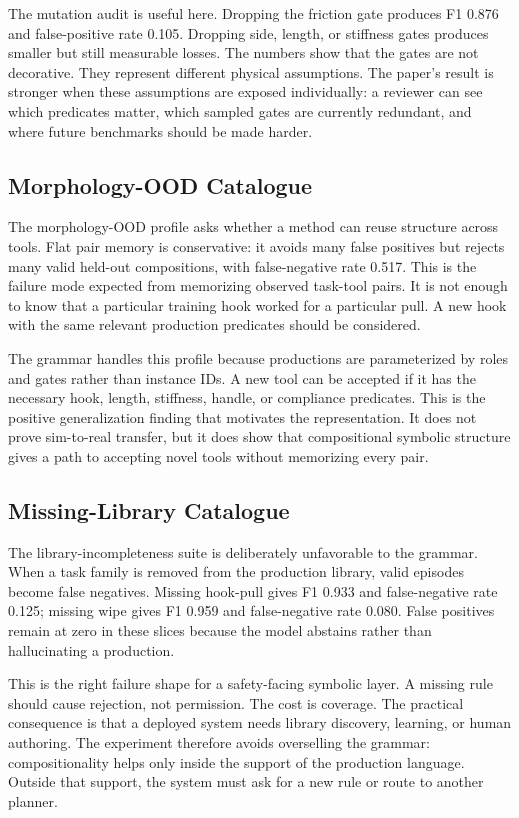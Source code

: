 \documentclass{article}
\begin{document}
The mutation audit is useful here. Dropping the friction gate produces F1 0.876 and false-positive rate 0.105. Dropping side, length, or stiffness gates produces smaller but still measurable losses. The numbers show that the gates are not decorative. They represent different physical assumptions. The paper's result is stronger when these assumptions are exposed individually: a reviewer can see which predicates matter, which sampled gates are currently redundant, and where future benchmarks should be made harder.

\subsection{Morphology-OOD Catalogue}

The morphology-OOD profile asks whether a method can reuse structure across tools. Flat pair memory is conservative: it avoids many false positives but rejects many valid held-out compositions, with false-negative rate 0.517. This is the failure mode expected from memorizing observed task-tool pairs. It is not enough to know that a particular training hook worked for a particular pull. A new hook with the same relevant production predicates should be considered.

The grammar handles this profile because productions are parameterized by roles and gates rather than instance IDs. A new tool can be accepted if it has the necessary hook, length, stiffness, handle, or compliance predicates. This is the positive generalization finding that motivates the representation. It does not prove sim-to-real transfer, but it does show that compositional symbolic structure gives a path to accepting novel tools without memorizing every pair.

\subsection{Missing-Library Catalogue}

The library-incompleteness suite is deliberately unfavorable to the grammar. When a task family is removed from the production library, valid episodes become false negatives. Missing hook-pull gives F1 0.933 and false-negative rate 0.125; missing wipe gives F1 0.959 and false-negative rate 0.080. False positives remain at zero in these slices because the model abstains rather than hallucinating a production.

This is the right failure shape for a safety-facing symbolic layer. A missing rule should cause rejection, not permission. The cost is coverage. The practical consequence is that a deployed system needs library discovery, learning, or human authoring. The experiment therefore avoids overselling the grammar: compositionality helps only inside the support of the production language. Outside that support, the system must ask for a new rule or route to another planner.
\end{document}
